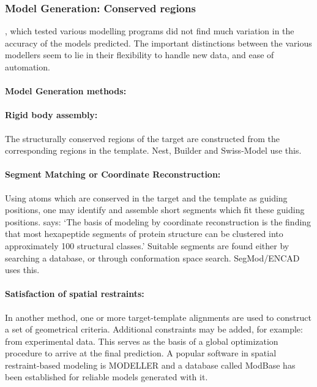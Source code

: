 \documentclass[10pt]{report}
\begin{document}
\subsubsection{Model Generation: Conserved regions}

\cite{dalton07}, which tested various modelling programs did not find much variation in the accuracy of the models predicted. The important distinctions between the various modellers seem to lie in their flexibility to handle new data, and ease of automation.

\paragraph{Model Generation methods:}

\paragraph{Rigid body assembly:} The structurally conserved regions of the target are constructed from the corresponding regions in the template. Nest, Builder and Swiss-Model use this. \cite{dalton07}

\paragraph{Segment Matching or Coordinate Reconstruction:} Using atoms which are conserved in the target and the template as guiding positions, one may identify and assemble short segments which fit these guiding positions. \cite{marti-renom2000com} says: `The basis of modeling by coordinate reconstruction is the finding that most hexapeptide segments of protein structure can be clustered into approximately 100 structural classes.' Suitable segments are found either by searching a database, or through conformation space search. SegMod/ENCAD uses this. \cite{dalton07}

\paragraph{Satisfaction of spatial restraints:} In another method, one or more target-template alignments are used to construct a set of geometrical criteria. Additional constraints may be added, for example: from experimental data. This serves as the basis of a global optimization procedure to arrive at the final prediction. \cite{sali93, john2003com, galperin03} A popular software in spatial restraint-based modeling is MODELLER and a database called ModBase has been established for reliable models generated with it. \cite{pieper2004mod}
\end{document}
